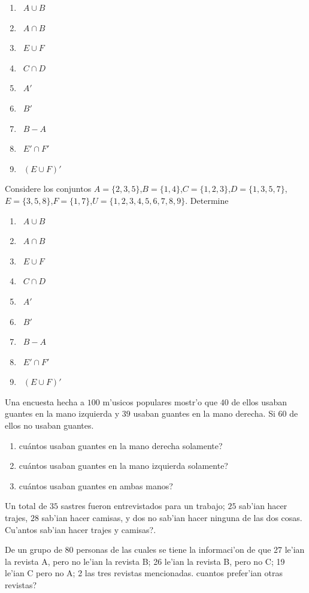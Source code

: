 \documentclass[]{book}
\theoremstyle{definition}
\theoremstyle{definition}
\theoremstyle{definition}
\theoremstyle{remark}
\begin{document}
\begin{enumerate}
	\item \ $A\cup B$
	\item \ $A\cap B$
	\item \ $E\cup F$
	\item \ $C\cap D$
	\item \ $A'$
	\item \ $B'$
	\item \ $B-A$
	\item \ $E'\cap F'$
	\item \ $(E\cup F)'$
\end{enumerate}

Considere los conjuntos \(A=\{2,3,5\}\),\(B=\{1,4\}\),\(C=\{1,2,3\}\),\(D=\{1,3,5,7\}\),\(E=\{3,5,8\}\),\(F=\{1,7\}\),\(U=\{1,2,3,4,5,6,7,8,9\}\). Determine

\begin{enumerate}
	\item \ $A\cup B$
	\item \ $A\cap B$
	\item \ $E\cup F$
	\item \ $C\cap D$
	\item \ $A'$
	\item \ $B'$
	\item \ $B-A$
	\item \ $E'\cap F'$
	\item \ $(E\cup F)'$
\end{enumerate}

Una encuesta hecha a \(100\) m'usicos populares mostr'o que \(40\) de ellos usaban guantes en la mano izquierda y \(39\) usaban guantes en la mano derecha. Si \(60\) de ellos no usaban guantes.

\begin{enumerate}
    \item  cu\'antos usaban guantes en la mano derecha solamente?
    \item  cu\'antos usaban guantes en la mano izquierda solamente?
    \item  cu\'antos usaban guantes en ambas manos?
\end{enumerate}

Un total de \(35\) sastres fueron entrevistados para un trabajo; \(25\) sab'ian hacer trajes, \(28\) sab'ian hacer camisas, y dos no sab'ian hacer ninguna de las dos cosas. Cu'antos sab'ian hacer trajes y camisas?.

De un grupo de 80 personas de las cuales se tiene la informaci'on de que 27 le'ian la revista A, pero no le'ian la revista B; 26 le'ian la revista B, pero no C; 19 le'ian C pero no A; 2 las tres revistas mencionadas. cuantos prefer'ian otras revistas?
\end{document}
